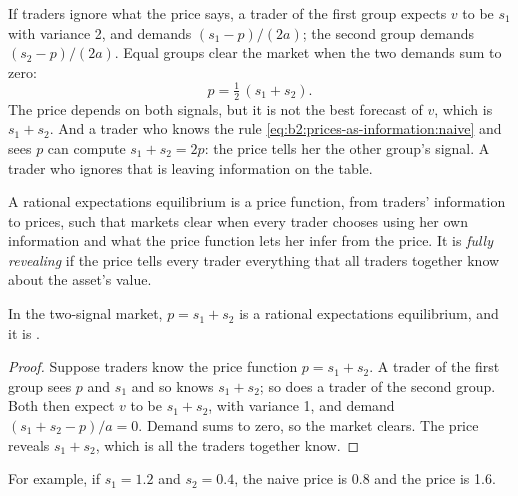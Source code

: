 If traders ignore what the price says, a trader of the first group expects $v$ to be $s_1$ with variance
2, and demands $(s_1 - p)/(2a)$; the second group demands $(s_2 - p)/(2a)$. Equal groups clear the market
when the two demands sum to zero:
\begin{equation}\label{eq:b2:prices-as-information:naive}
p = \tfrac12\,(s_1 + s_2).
\end{equation}
The price depends on both signals, but it is not the best forecast of $v$, which is $s_1 + s_2$. And a
trader who knows the rule \eqref{eq:b2:prices-as-information:naive} and sees $p$ can compute $s_1 + s_2 =
2p$: the price tells her the other group's signal. A trader who ignores that is leaving information on the
table.

\begin{definition}\label{def:b2:prices-as-information:fully-revealing}
A rational expectations equilibrium is a price function, from traders' information to prices,
such that markets clear when every trader chooses using her own information and what the price
function lets her infer from the price. It is \emph{fully revealing}
if the price tells every trader everything that all traders together know about the asset's value.
\end{definition}

\begin{proposition}\label{prop:b2:prices-as-information:revealing}
In the two-signal market, $p = s_1 + s_2$ is a rational expectations equilibrium, and it is .
\end{proposition}

\begin{proof}
Suppose traders know the price function $p = s_1 + s_2$. A trader of the first group sees $p$ and $s_1$
and so knows $s_1 + s_2$; so does a trader of the second group. Both then expect $v$ to be $s_1 + s_2$, with
variance 1, and demand $(s_1 + s_2 - p)/a = 0$. Demand sums to zero, so the market clears. The price
reveals $s_1 + s_2$, which is all the traders together know.
\end{proof}

For example, if $s_1 = 1.2$ and $s_2 = 0.4$, the naive price is 0.8 and the  price is 1.6.

